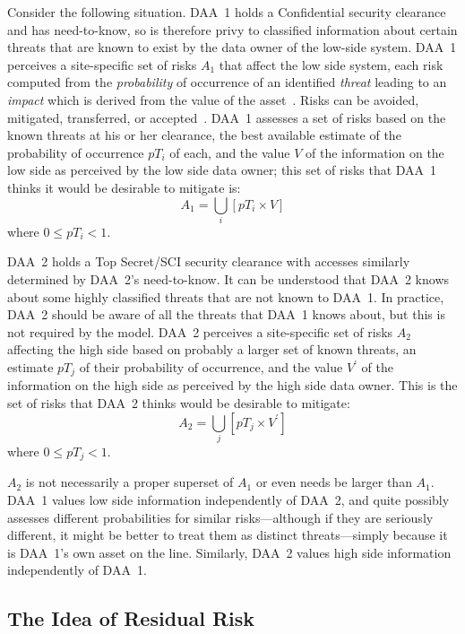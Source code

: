 \documentclass{llncs}
\begin{document}
Consider the following situation.  DAA~1 holds a Confidential security
clearance and has need-to-know, so is therefore privy to classified
information about certain threats that are known to exist by the data
owner of the low-side system.  DAA~1 perceives a site-specific set of
risks $A_1$ that affect the low side system, each risk computed from the \emph{probability} of
occurrence of an identified \emph{threat} leading to an \emph{impact} which is derived
from the value of the asset~\cite{Flechais2005}.
Risks can be avoided, mitigated, transferred, or accepted~\cite{Tockey2004}.
DAA~1 assesses
a set of risks based on the known threats at his or her clearance, the
best available estimate of the probability of
occurrence $pT_i$ of each, and the value $V$ of the information on the low side as
perceived by the low side data owner; this
set of risks that DAA~1 thinks it would be desirable to mitigate is:
\begin{equation}
A_1 = \bigcup_i\left[pT_i\times V\right]
\end{equation}
where $0 \leq pT_i < 1$.

DAA~2 holds a Top Secret/SCI security clearance with accesses similarly determined
by DAA~2's need-to-know.  It can be understood that DAA~2 knows about
some highly classified
threats that are not known to DAA~1.  In practice, DAA~2 should be aware
of all the threats that DAA~1 knows about, but this is not required by
the model.  DAA~2 perceives a site-specific set of risks $A_2$ affecting
the high side based on probably a larger set of known threats, an estimate
$pT_j$
of their probability of occurrence, and the value $V^\prime$ of the information on the
high side as perceived by the high side data owner.  This is the set of
risks that DAA~2 thinks would be desirable to mitigate:
\begin{equation}
A_2 = \bigcup_j\left[pT_j\times V^\prime \right]
\end{equation} where $0 \leq pT_j < 1$.

$A_2$ is not necessarily a proper superset of $A_1$ or even needs be
larger than $A_1$.
DAA~1 values low side information independently of DAA~2, and quite
possibly assesses different probabilities for similar risks---although if
they are seriously different, it might be better to treat them as distinct
threats---simply because it is DAA~1's own asset on the line.  Similarly, DAA~2
values high side information independently of DAA~1.

\subsection{The Idea of Residual Risk}
\end{document}
